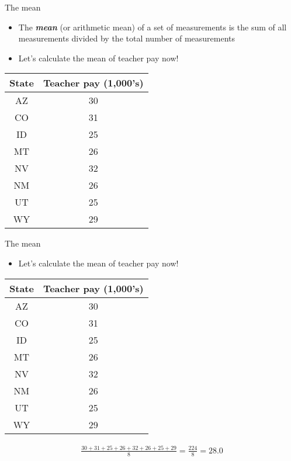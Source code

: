 \documentclass[xcolor=dvipsnames]{beamer}
\begin{document}
\begin{frame}{The mean}
	\begin{itemize}
		\item The \emph{\textbf{mean}} (or arithmetic mean) of a set of measurements is the sum of all measurements divided by the total number of measurements 
		\item Let's calculate the mean of teacher pay now!
	\end{itemize}
		\begin{center}
			\begin{tabular}{|c|c|}
				\hline 
				\textbf{State} & \textbf{Teacher pay (1,000's)} \\ 
				\hline \hline
				AZ & 30 \\ \hline 
				CO &  31 \\ \hline 
				ID & 25  \\  \hline 
				MT &  26 \\ \hline 
				NV & 32 \\ \hline 
				NM &  26 \\ \hline 
				UT &  25 \\ \hline 
				WY &  29 \\ \hline 
			\end{tabular} 
		\end{center}
\end{frame}

\begin{frame}{The mean}
	\begin{itemize}
		\item Let's calculate the mean of teacher pay now!
	\end{itemize}
	\begin{center}
		\begin{tabular}{|c|c|}
			\hline 
			\textbf{State} & \textbf{Teacher pay (1,000's)} \\ 
			\hline \hline
			AZ & 30 \\ \hline 
			CO &  31 \\ \hline 
			ID & 25  \\  \hline 
			MT &  26 \\ \hline 
			NV & 32 \\ \hline 
			NM &  26 \\ \hline 
			UT &  25 \\ \hline 
			WY &  29 \\ \hline 
		\end{tabular} 
	\end{center}
\begin{gather*}
	\frac{30+31+25+26+32+26+25+29}{8} = \frac{224}{8} = 28.0
\end{gather*}
\end{frame}
\end{document}
